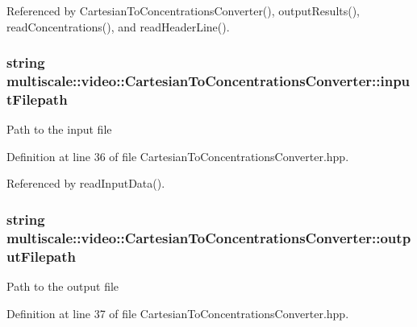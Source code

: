 Referenced by Cartesian\-To\-Concentrations\-Converter(), output\-Results(), read\-Concentrations(), and read\-Header\-Line().

\hypertarget{classmultiscale_1_1video_1_1CartesianToConcentrationsConverter_affebbc7e1c67692bd529f19fc0451e58}{
\subsubsection[{input\-Filepath}]{\setlength{\rightskip}{0pt plus 5cm}string multiscale\-::video\-::\-Cartesian\-To\-Concentrations\-Converter\-::input\-Filepath\hspace{0.3cm}{\ttfamily [private]}}}\label{classmultiscale_1_1video_1_1CartesianToConcentrationsConverter_affebbc7e1c67692bd529f19fc0451e58}
Path to the input file 

Definition at line 36 of file Cartesian\-To\-Concentrations\-Converter.\-hpp.



Referenced by read\-Input\-Data().

\hypertarget{classmultiscale_1_1video_1_1CartesianToConcentrationsConverter_a9215448e33876a581b206a89b6651fd0}{
\subsubsection[{output\-Filepath}]{\setlength{\rightskip}{0pt plus 5cm}string multiscale\-::video\-::\-Cartesian\-To\-Concentrations\-Converter\-::output\-Filepath\hspace{0.3cm}{\ttfamily [private]}}}\label{classmultiscale_1_1video_1_1CartesianToConcentrationsConverter_a9215448e33876a581b206a89b6651fd0}
Path to the output file 

Definition at line 37 of file Cartesian\-To\-Concentrations\-Converter.\-hpp.



